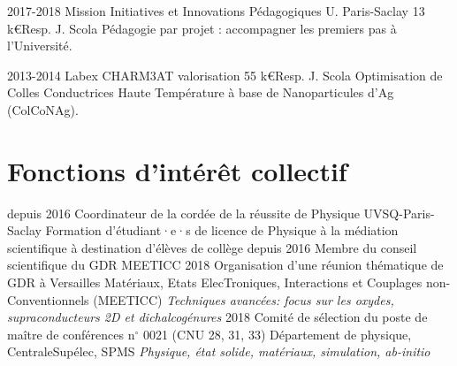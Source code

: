 \documentclass[11pt,a4paper,nolmodern]{moderncv}
\begin{document}
	\cventry
	{2017-2018}
	{Mission Initiatives et Innovations Pédagogiques U. Paris-Saclay} {13 k€}{Resp. J. Scola}{}
	{Pédagogie par projet : accompagner les premiers pas à l'Université.}

	\cventry
	{2013-2014}
	{Labex CHARM3AT valorisation} {55 k€}{Resp. J. Scola}{}
	{Optimisation de Colles Conductrices Haute Température à base de Nanoparticules d'Ag (ColCoNAg).}

\iffalse	
	\subsection{Partenariats}	
	\cventry
	{2009-2011}
	{Partenariat Hubert Curien Pessoa}{}{Resp. français: J. Scola, Resp. portugais: D. S. Schmool}{}
	{\emph{Spin dynamics and magneto-transport in all oxide magnetic multilayers.}}
\fi
	

\newpage 

\section{Fonctions d'intérêt collectif}
\cventry
	{depuis 2016}
	{Coordinateur de la cordée de la réussite de Physique}{}
	{UVSQ-Paris-Saclay}
	{Formation d'étudiant·e·s de licence de Physique à la médiation scientifique à destination d'élèves de collège}
	{}
\cventry
	{depuis 2016}
	{Membre du conseil scientifique du GDR MEETICC}{}
	{}
	{}
	{}
\cventry
	{2018}
	{Organisation d'une réunion thématique de GDR à Versailles}{}
	{Matériaux, Etats ElecTroniques, Interactions et Couplages non-Conventionnels (MEETICC)}
	{\emph{Techniques avancées: focus sur les oxydes, supraconducteurs 2D et dichalcogénures}}
	{}
\cventry
	{2018}
	{Comité de sélection du poste de maître de conférences n$^\circ$ 0021 (CNU 28, 31, 33)}{}
	{Département de physique, CentraleSupélec, SPMS}
	{\emph{Physique, état solide, matériaux, simulation, ab-initio}}{}
\iffalse
\cventry
	{2014}
	{Co-organisation d'un mini-colloque de la Condensed Matter in Paris (CMD25-JMC14)}{}
	{divisions Matière Condensée des Sociétés européenne et française de Physique}
	{\emph{Strongly correlated systems I: Recent advances on metal-insulator transitions of correlated matter}}
	{}
\cventry
	{2011}
	{Comité de sélection du poste de maître de conférences n$^\circ$ 0108 (CNU 28)}{}
	{Institut Galilée, Université Paris 13}
	{\emph{Physique des matériaux fonctionnels et couplage}}{}
\cventry
	{2010}
	{Comité de sélection du poste de maître de conférences n$^\circ$ 0791 (CNU 28)}{}
	{Université de Versailles St-Quentin}
	{\emph{Auto-organisation dans les solides moléculaires photo-commutables}}{}
\cventry
	{2010-2015}
	{Président de jury}
	{Semestre 2 de la première année de Licence, parcours Physique-Chimie}
	{}
	{}{}	
\fi
\end{document}
